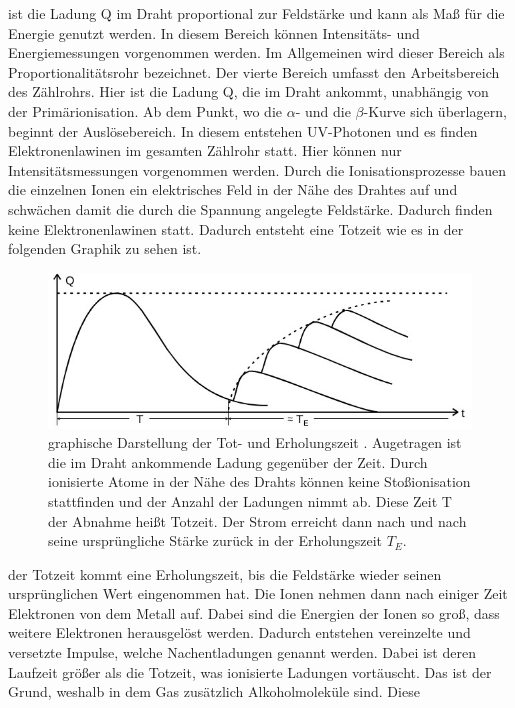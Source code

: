 ist die Ladung Q im Draht proportional zur Feldstärke und kann als Maß für die
Energie genutzt werden. In diesem Bereich können Intensitäts- und Energiemessungen
vorgenommen werden. Im Allgemeinen wird dieser Bereich als Proportionalitätsrohr bezeichnet.
Der vierte Bereich umfasst den Arbeitsbereich des Zählrohrs. Hier ist die Ladung Q, die im Draht
ankommt, unabhängig von der Primärionisation. 
Ab dem Punkt, wo die $\alpha $- und die $\beta$-Kurve sich überlagern, beginnt der Auslösebereich.
In diesem entstehen UV-Photonen und es finden Elektronenlawinen im gesamten Zählrohr statt.
Hier können nur Intensitätsmessungen vorgenommen werden.
Durch die Ionisationsprozesse bauen die einzelnen Ionen ein elektrisches Feld in der Nähe des
Drahtes auf und schwächen damit die durch die Spannung angelegte Feldstärke. Dadurch finden
keine Elektronenlawinen statt. Dadurch entsteht eine Totzeit wie es in der folgenden Graphik 
zu sehen ist. 
\begin{figure}[H]
    \centering
    \includegraphics[width=\linewidth]{images/totzeit.jpg}
    \caption{graphische Darstellung der Tot- und Erholungszeit \cite{V703}.
    Augetragen ist die im Draht ankommende Ladung gegenüber der Zeit. 
    Durch ionisierte Atome in der Nähe des Drahts können keine Stoßionisation
    stattfinden und der Anzahl der Ladungen nimmt ab. Diese Zeit T der Abnahme
    heißt Totzeit. Der Strom erreicht dann nach und nach seine ursprüngliche 
    Stärke zurück in der Erholungszeit $T_E$.
    }
    \label{fig:3}
\end{figure}
\justifying der Totzeit kommt eine Erholungszeit, bis die Feldstärke wieder seinen ursprünglichen Wert eingenommen hat.
Die Ionen nehmen dann nach einiger Zeit Elektronen von dem Metall auf. Dabei sind
die Energien der Ionen so groß, dass weitere Elektronen herausgelöst werden.
Dadurch entstehen vereinzelte und versetzte Impulse, welche Nachentladungen
genannt werden. Dabei ist deren Laufzeit größer als die Totzeit, was 
ionisierte Ladungen vortäuscht.
Das ist der Grund, weshalb in dem Gas zusätzlich Alkoholmoleküle sind. Diese
